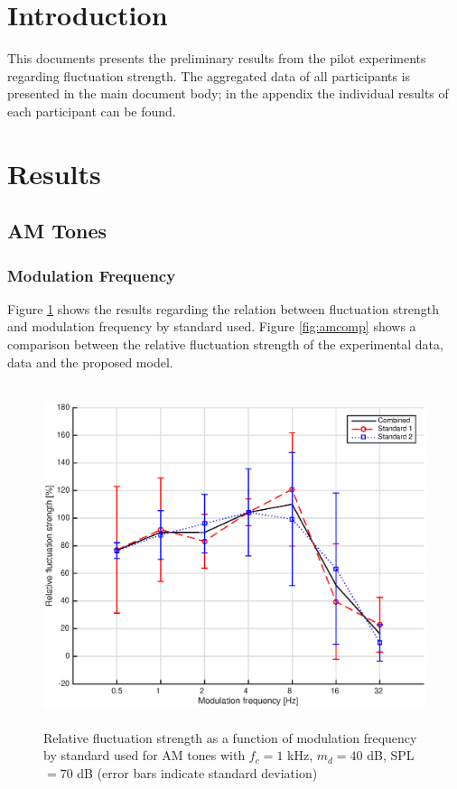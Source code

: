 \documentclass[a4paper]{article}
\begin{document}

\section{Introduction}

This documents presents the preliminary results from the pilot experiments
regarding fluctuation strength. The aggregated data of all participants is
presented in the main document body; in the appendix the individual results of
each participant can be found.

\section{Results}

\subsection{AM Tones}

\subsubsection{Modulation Frequency}

Figure \ref{fig:amstds} shows the results regarding the relation between
fluctuation strength and modulation frequency by standard used. Figure
\ref{fig:amcomp} shows a comparison between the relative fluctuation strength
of the experimental data, \citeauthor{Fastl2007Psychoacoustics} data and the
proposed model.

\begin{figure}[ht!]
    \centering
    \includegraphics[height=10cm]{img/AM_tones-fm-results-All-standards}
    \caption{Relative fluctuation strength as a function of modulation
        frequency by standard used for AM tones with $f_c = 1$ kHz, $m_d = 40$
        dB, SPL $= 70$ dB (error bars indicate standard deviation)}
    \label{fig:amstds}
\end{figure}
\end{document}
